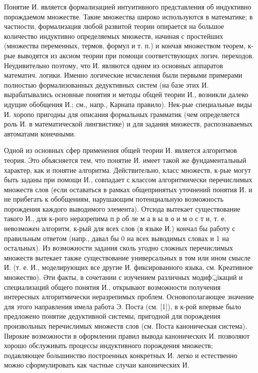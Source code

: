 \documentclass[10pt]{article}
\begin{document}
Понятие И. является формализацией интуитивного представления об индуктивно порождаемом множестве. Такие множества широко используются в математике; в частности, формализация любой развитой теории опирается на большое количество индуктивно определяемых множеств, начиная с простейших (множества переменных, термов, формул и т. п.) и кончая множеством теорем, к-рые выводятся из аксиом теории при помощи соответствующих логич. переходов. Неудивительно поэтому, что И. являются одним из основных аппаратов математич. логики. Именно логические исчисления были первыми примерами полностью формализованных дедуктивных систем (на базе этих И. вырабатывались основные понятия и методы общей теории И., возникли далеко идущие обобщения И.; см., напр., Карнапа правило). Нек-рые специальные виды И. хоропо пригодны для описания формальных грамматик (чем определяется роль И. в математической лингвистике) и для задания множеств, распознаваемых автоматами конечными.



Одной из основных сфер применения общей теории И. является алгоритмов теория. Это объясняется тем, что понятие И. имеет такой же фундаментальный характер, как и понятие алгоритма. Действительно, класс множеств, к-рые могут быть заданы при помощи И., совпадает с классом алгоритмически перечислимых множеств слов (если оставаться в рамках общепринятых уточнений понятия И. и не прибегать к обобщениям, нарушающим потенциальную возможность порождения каждого выводимого элемента). Отсюда вытекает существование такого И., для к-рого неразрепима п р об ле м а в ы в о и м о с т и, т. е. невозможен алгоритм, к-рый для всех слов (в языке И.) кончал бы работу с правильным ответом (напр., давал бы 0 на всех выводимых словах и 1 на остальных). Из возможности задания сколь угодно сложных перечислимых множеств вытекает также существование универсальных в том или ином смысле И. (т. е. И., моделирующих все другие И. фиксированного языка, см. Креативное множество). Әти факты, в сочетании с изучением различных модиф্রікаций и специализаций общего понятия И., открывают возможности получения интересных алгоритмически неразрепимых проблем. Основополагающее значение для этого направления имела работа Э. Поста (см. [1]), в к-рой впервые было предложено понятие дедуктивной системы, пригодной для порождения произвольных перечислимых множеств слов (см. Поста каноническая система). ІІирокие возможности в оформлении правил вывода канонических И. позволяют хорошо обслуживать процессы индуктивного порождения множеств; подавляющее большинство построенных конкретных И. легко и естественно можно сформулировать как частные случаи канонических И.
\end{document}
